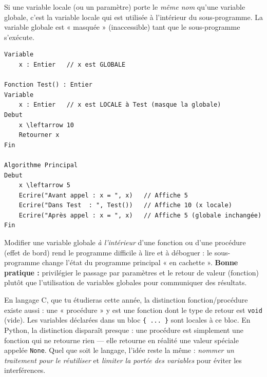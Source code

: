 \documentclass[11pt]{article}
\begin{document}
\begin{propriete}
Si une variable locale (ou un paramètre) porte le \emph{même nom} qu'une variable globale, c'est la variable locale qui est utilisée à l'intérieur du sous-programme. La variable globale est « masquée » (inaccessible) tant que le sous-programme s'exécute.
\end{propriete}

\begin{exemplebox}
\begin{lstlisting}
Variable
    x : Entier   // x est GLOBALE

Fonction Test() : Entier
Variable
    x : Entier   // x est LOCALE à Test (masque la globale)
Debut
    x \leftarrow 10
    Retourner x
Fin

Algorithme Principal
Debut
    x \leftarrow 5
    Ecrire("Avant appel : x = ", x)   // Affiche 5
    Ecrire("Dans Test  : ", Test())   // Affiche 10 (x locale)
    Ecrire("Après appel : x = ", x)   // Affiche 5 (globale inchangée)
Fin
\end{lstlisting}
\end{exemplebox}

\begin{attention}
Modifier une variable globale \emph{à l'intérieur} d'une fonction ou d'une procédure (effet de bord) rend le programme difficile à lire et à déboguer : le sous-programme change l'état du programme principal « en cachette ». \textbf{Bonne pratique :} privilégier le passage par paramètres et le retour de valeur (fonction) plutôt que l'utilisation de variables globales pour communiquer des résultats.
\end{attention}

\begin{savaistu}
En langage C, que tu étudieras cette année, la distinction fonction/procédure existe aussi : une « procédure » y est une fonction dont le type de retour est \texttt{void} (vide). Les variables déclarées dans un bloc \texttt{\{ ... \}} sont locales à ce bloc. En Python, la distinction disparaît presque : une procédure est simplement une fonction qui ne retourne rien — elle retourne en réalité une valeur spéciale appelée \texttt{None}. Quel que soit le langage, l'idée reste la même : \emph{nommer un traitement pour le réutiliser} et \emph{limiter la portée des variables} pour éviter les interférences.
\end{savaistu}
\end{document}
